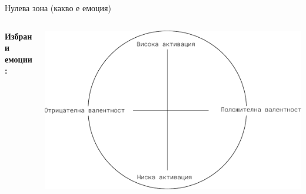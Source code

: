 \documentclass[9pt]{beamer}
\begin{document}
    \begin{frame}{Нулева зона (какво е емоция)}
        \begin{columns}[T] %
            \begin{column}{.38\textwidth}
                \textbf{Избрани емоции:}
                \vspace{1cm} \leavevmode \newline
                \phantom{$\bullet\ $ Гняв}
                \vspace{1cm} \leavevmode \newline
                \phantom{$\bullet\ $ Щастие}
                \vspace{1cm} \leavevmode \newline
                \phantom{$\bullet\ $ Неутрална емоция}
                \vspace{1cm} \leavevmode \newline
                \phantom{$\bullet\ $ Тъга}
            \end{column}%
            \hfill%
            \begin{column}{.60\textwidth}
                \vspace{1cm}
                \begin{center}
                    \includegraphics[width=\textwidth]{valence_arousal_empty}%
                \end{center}
            \end{column}%
        \end{columns}
    \end{frame}
\end{document}
